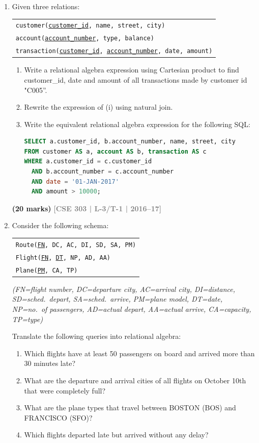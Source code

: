 \documentclass[12pt]{article}
\newcommand{\yr}[1]{\hfill\textcolor{gray}{\small\textbf{[#1]}}}
\newcommand{\mk}[1]{\textcolor{orange!70!black}{\small\textbf{(#1 marks)}}}
\begin{document}
\begin{enumerate}
\item Given three relations:
\begin{center}
\begin{tabular}{l}
\texttt{customer(\underline{customer\_id}, name, street, city)}\\
\texttt{account(\underline{account\_number}, type, balance)}\\
\texttt{transaction(\underline{customer\_id}, \underline{account\_number}, date, amount)}
\end{tabular}
\end{center}
\begin{enumerate}
  \item Write a relational algebra expression using Cartesian product to find customer\_id, date and amount of all transactions made by customer id "C005''.
  \item Rewrite the expression of (i) using natural join.
  \item Write the equivalent relational algebra expression for the following SQL:
\begin{lstlisting}[language=SQL]
SELECT a.customer_id, b.account_number, name, street, city
FROM customer AS a, account AS b, transaction AS c
WHERE a.customer_id = c.customer_id
  AND b.account_number = c.account_number
  AND date = '01-JAN-2017'
  AND amount > 10000;
\end{lstlisting}
\end{enumerate}
\mk{20} \yr{CSE 303 | L-3/T-1 | 2016--17}


\item Consider the following schema:
\begin{center}
\begin{tabular}{l}
\texttt{Route(\underline{FN}, DC, AC, DI, SD, SA, PM)}\\
\texttt{Flight(\underline{FN}, \underline{DT}, NP, AD, AA)}\\
\texttt{Plane(\underline{PM}, CA, TP)}
\end{tabular}
\end{center}
\textit{(FN=flight number, DC=departure city, AC=arrival city, DI=distance, SD=sched.\ depart, SA=sched.\ arrive, PM=plane model, DT=date, NP=no.\ of passengers, AD=actual depart, AA=actual arrive, CA=capacity, TP=type)}

Translate the following queries into relational algebra:
\begin{enumerate}
  \item Which flights have at least 50 passengers on board and arrived more than 30 minutes late?
  \item What are the departure and arrival cities of all flights on October 10th that were completely full?
  \item What are the plane types that travel between BOSTON (BOS) and FRANCISCO (SFO)?
  \item Which flights departed late but arrived without any delay?
\end{enumerate}
\begin{center}
\renewcommand{\arraystretch}{1.1} %
\begin{tabular}{cl}


\end{tabular}
\end{center}
\end{enumerate}
\end{document}
